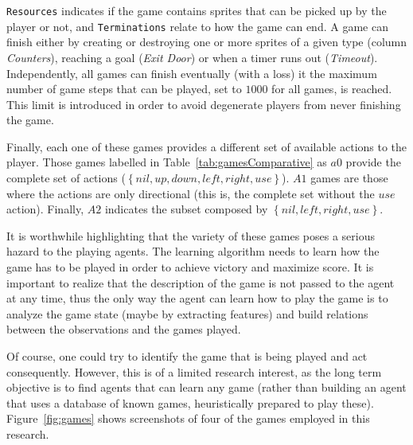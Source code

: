 \documentclass[conference]{IEEEtran}
\begin{document}
\texttt{Resources} indicates if the game contains sprites that can be picked up by the player or not, and \texttt{Terminations} relate to how the game can end. A game can finish either by creating or destroying one or more sprites of a given type (column \textit{Counters}), reaching a goal (\textit{Exit Door}) or when a timer runs out (\textit{Timeout}). Independently, all games can finish eventually (with a loss) it the maximum number of game steps that can be played, set to $1000$ for all games, is reached. This limit is introduced in order to avoid degenerate players from never finishing the game.

Finally, each one of these games provides a different set of available actions to the player. Those games labelled in Table~\ref{tab:gamesComparative} as $a0$ provide the complete set of actions ($\left \{ nil, up, down, left, right, use \right \}$). $A1$ games are those where the actions are only directional (this is, the complete set without the $use$ action). Finally, $A2$ indicates the subset composed by $\left \{ nil, left, right, use \right \}$.

It is worthwhile highlighting that the variety of these games poses a serious hazard to the playing agents. The learning algorithm needs to learn how the game has to be played in order to achieve victory and maximize score. It is important to realize that the description of the game is not passed to the agent at any time, thus the only way the agent can learn how to play the game is to analyze the game state (maybe by extracting features) and build relations between the observations and the games played.

Of course, one could try to identify the game that is being played and act consequently. However, this is of a limited research interest, as the long term objective is to find agents that can learn any game (rather than building an agent that uses a database of known games, heuristically prepared to play these).  Figure~\ref{fig:games} shows screenshots of four of the games employed in this research.
\end{document}
